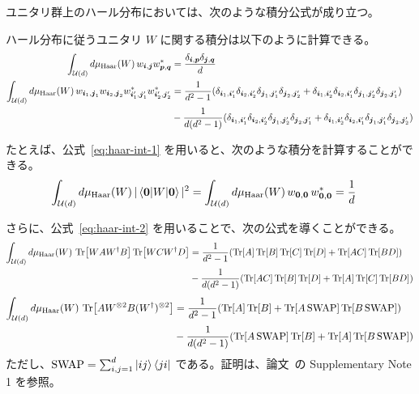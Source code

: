 ユニタリ群上のハール分布においては、次のような積分公式が成り立つ。
\begin{screen}
    \begin{theorem}
        ハール分布に従うユニタリ $W$ に関する積分は以下のように計算できる。
        \begin{align}
            \int_{\mathcal{U}(d)} d\mu_{\mathrm{Haar}}(W)\, w_{\boldsymbol{i},\boldsymbol{j}}
            w_{\boldsymbol{p},\boldsymbol{q}}^*
            &= \frac{\delta_{\boldsymbol{i},\boldsymbol{p}}\delta_{\boldsymbol{j},\boldsymbol{q}}}{d} \label{eq:haar-int-1}\\
            \int_{\mathcal{U}(d)} d\mu_{\mathrm{Haar}}(W)\, w_{\boldsymbol{i}_1,\boldsymbol{j}_1}
            w_{\boldsymbol{i}_2,\boldsymbol{j}_2}
            w_{\boldsymbol{i}_1^\prime,\boldsymbol{j}_1^\prime}^*
            w_{\boldsymbol{i}_2^\prime,\boldsymbol{j}_2^\prime}^*
            &= \frac{1}{d^2-1}
            (\delta_{\boldsymbol{i}_1,\boldsymbol{i}_1^\prime}\delta_{\boldsymbol{i}_2,\boldsymbol{i}_2^\prime}
            \delta_{\boldsymbol{j}_1,\boldsymbol{j}_1^\prime}\delta_{\boldsymbol{j}_2,\boldsymbol{j}_2^\prime}
            +\delta_{\boldsymbol{i}_1,\boldsymbol{i}_2^\prime}\delta_{\boldsymbol{i}_2,\boldsymbol{i}_1^\prime}
            \delta_{\boldsymbol{j}_1,\boldsymbol{j}_2^\prime}\delta_{\boldsymbol{j}_2,\boldsymbol{j}_1^\prime}) \nonumber\\
            &- \frac{1}{d(d^2-1)}
            (\delta_{\boldsymbol{i}_1,\boldsymbol{i}_1^\prime}\delta_{\boldsymbol{i}_2,\boldsymbol{i}_2^\prime}
            \delta_{\boldsymbol{j}_1,\boldsymbol{j}_2^\prime}\delta_{\boldsymbol{j}_2,\boldsymbol{j}_1^\prime}
            +\delta_{\boldsymbol{i}_1,\boldsymbol{i}_2^\prime}\delta_{\boldsymbol{i}_2,\boldsymbol{i}_1^\prime}
            \delta_{\boldsymbol{j}_1,\boldsymbol{j}_1^\prime}\delta_{\boldsymbol{j}_2,\boldsymbol{j}_2^\prime}) \label{eq:haar-int-2}
        \end{align}
    \end{theorem}
\end{screen}

たとえば、公式~\eqref{eq:haar-int-1} を用いると、次のような積分を計算することができる。
\begin{align}
    \int_{\calU(d)} d\mu_{\Haar}(W)\, |\ev{W}{\bs{0}}|^2
    &= \int_{\calU(d)} d\mu_{\Haar}(W)\, w_{\bs{0},\bs{0}}\,w_{\bs{0},\bs{0}}^*
    = \frac{1}{d}
\end{align}

さらに、公式~\eqref{eq:haar-int-2} を用いることで、次の公式を導くことができる。
\begin{align}\label{eq:haar-int-5}
    \int_{\mathcal{U}(d)} d\mu_{\mathrm{Haar}}(W)\, \Tr[WAW^\dagger B]\Tr[WCW^\dagger D]
    &= \frac{1}{d^2-1}
    (\Tr[A]\Tr[B]\Tr[C]\Tr[D] + \Tr[AC]\Tr[BD]) \nonumber\\
    &- \frac{1}{d(d^2-1)}
    (\Tr[AC]\Tr[B]\Tr[D] + \Tr[A]\Tr[C]\Tr[BD])
\end{align}
\begin{align}\label{eq:haar-int-6}
    \int_{\mathcal{U}(d)} d\mu_{\mathrm{Haar}}(W)\, \Tr[AW^{\otimes {2}}B(W^\dagger)^{\otimes {2}}]
    &= \frac{1}{d^2-1}(\Tr[A]\Tr[B] + \Tr[A\,\mathrm{SWAP}]\Tr[B\,\mathrm{SWAP}]) \nonumber\\
    &- \frac{1}{d(d^2-1)}(\Tr[A\,\mathrm{SWAP}]\Tr[B] + \Tr[A]\Tr[B\,\mathrm{SWAP}])
\end{align}
ただし、$\mathrm{SWAP} = \sum_{i,j=1}^d \ket{ij}\bra{ji}$ である。証明は、論文~\cite{cerezo2021cost}の Supplementary Note 1 を参照。


